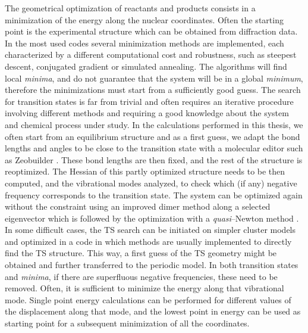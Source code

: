 The geometrical optimization of reactants and products consists in a minimization of the energy along the nuclear coordinates. Often the starting point is the experimental structure which can be obtained from diffraction data. In the most used codes several minimization methods are implemented, each characterized by a different computational cost and robustness, such as steepest descent, conjugated gradient or simulated annealing. The algorithms will find local \textit{minima}, and do not guarantee that the system will be in a global \textit{minimum}, therefore the minimizations must start from a sufficiently good guess. 
\npar
The search for transition states is far from trivial and often requires an iterative procedure involving different methods and requiring a good knowledge about the system and chemical process under study. In the calculations performed in this thesis, we often start from an equilibrium structure and as a first guess, we adapt the bond lengths and angles to be close to the transition state with a molecular editor such as Zeobuilder \cite{Verstraelen2008}. These bond lengths are then fixed, and the rest of the structure is reoptimized. The Hessian of this partly optimized structure needs to be then computed, and the vibrational modes analyzed, to check which (if any) negative frequency corresponds to the transition state. The system can be optimized again without the constraint using an improved dimer method along a selected eigenvector \cite{Heyden2005} which is followed by the optimization with a \textit{quasi}--Newton method \cite{Press1989}. In some difficult cases, the TS search can be initiated on simpler cluster models and optimized in a code in which methods are usually implemented to directly find the TS structure. This way, a first guess of the TS geometry might be obtained and further transferred to the periodic model. In both transition states and \textit{minima}, if there are superfluous negative frequencies, these need to be removed. Often, it is sufficient to minimize the energy along that vibrational mode. Single point energy calculations can be performed for different values of the displacement along that mode, and the lowest point in energy can be used as starting point for a subsequent minimization of all the coordinates.

